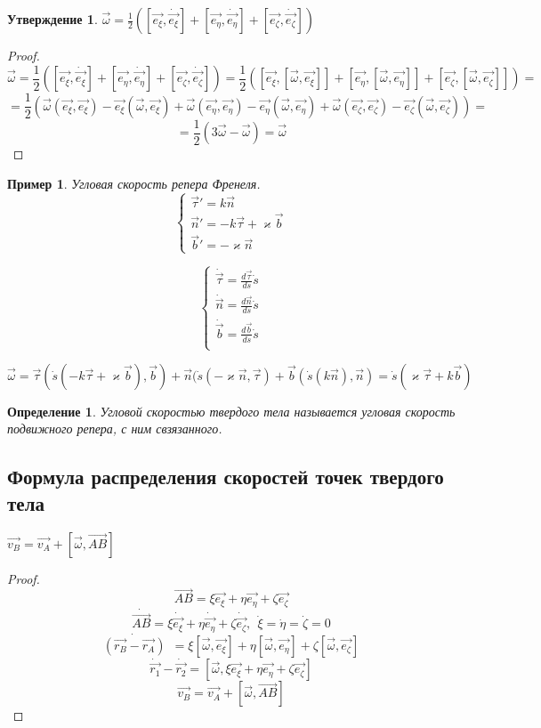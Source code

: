 \documentclass{article}
\renewcommand{\v}[1]{{\vec{#1}}}
\newtheorem*{df}{Определение}
\newtheorem{ass}{Утверждение}
\newtheorem*{xmp}{Пример}
\begin{document}
  \begin{ass}
  $ \v{\omega} = \frac{1}{2} ([\v{e_{\xi}}, \dot{\v{e_{\xi}}}] + [\v{e_{\eta}}, \dot{\v{e_{\eta}}}] + [\v{e_{\zeta}}, \dot{\v{e_{\zeta}}}]) $
  \end{ass}
  \begin{proof}
  $$ \v{\omega} 
  = \frac{1}{2} ([\v{e_{\xi}}, \dot{\v{e_{\xi}}}] + [\v{e_{\eta}}, \dot{\v{e_{\eta}}}] + [\v{e_{\zeta}}, \dot{\v{e_{\zeta}}}]) 
  = \frac{1}{2} ([\v{e_{\xi}}, [\v{\omega}, \v{e_{\xi}}]] + [\v{e_{\eta}}, [\v{\omega}, \v{e_{\eta}}]] + [\v{e_{\zeta}}, [\v{\omega}, \v{e_{\zeta}}]]) = $$
  $$ = \frac{1}{2} \left( \v{\omega}(\v{e_{\xi}}, \v{e_{\xi}}) - \v{e_{\xi}}(\v{\omega}, \v{e_{\xi}}) + \v{\omega}(\v{e_{\eta}}, \v{e_{\eta}}) - \v{e_{\eta}}(\v{\omega}, \v{e_{\eta}}) + \v{\omega}(\v{e_{\zeta}}, \v{e_{\zeta}}) - \v{e_{\zeta}}(\v{\omega}, \v{e_{\zeta}}) \right) = $$ 
  $$ = \frac{1}{2}(3\v{\omega} - \v{\omega}) = \v{\omega} $$
  \end{proof}
  
  \begin{xmp}
  Угловая скорость репера Френеля.
  $$ 
  \begin{cases}
  \v{\tau}' = k \v{n} \\
  \v{n}' = - k\v{\tau} + \varkappa \v{b} \\
  \v{b}' = -\varkappa\v{n}
  \end{cases}
  $$
  
  $$
  \begin{cases}
  \dot{\v{\tau}} = \frac{d\v{\tau}}{ds} \dot s \\
  \dot{\v{n}} = \frac{d\v{n}}{ds} \dot s \\
  \dot{\v{b}} = \frac{d\v{b}}{ds} \dot s \\
  \end{cases} 
  $$
  
  $$ \v{\omega} = \v{\tau}(\dot s (-k\v{\tau} + \varkappa\v{b}), \v{b}) + \v{n}(\dot s (-\varkappa\v{n}, \v{\tau}) + \v{b}(\dot s(k \v{n}), \v{n}) = \dot s (\varkappa\v{\tau} + k\v{b}) $$
  \end{xmp}
  
  \begin{df}
  Угловой скоростью твердого тела называется угловая скорость подвижного репера, с ним свзязанного.
  \end{df}
 
  \subsection{Формула распределения скоростей точек твердого тела}
  $ \v{v_B} = \v{v_A} + [\v{\omega}, \v{AB}] $
  \begin{proof}
  $$ \v{AB} = \xi \v{e_{\xi}} + \eta \v{e_{\eta}} + \zeta \v{e_{\zeta}} $$
  $$ \dot{\v{AB}} = \xi \dot{\v{e_{\xi}}} + \eta \dot{\v{e_{\eta}}} + \zeta \dot{\v{e_{\zeta}}},~~ \dot{\xi} = \dot{\eta} = \dot{\zeta} = 0 $$
  $$ \dot{\left(\v{r_B} - \v{r_A}\right)}~~ = \xi[\v{\omega}, \v{e_{\xi}}] + \eta[\v{\omega}, \v{e_{\eta}}] + \zeta[\v{\omega}, \v{e_{\zeta}}] $$ 
  $$ \dot{\v{r_1}} - \dot{\v{r_2}} = [\v{\omega}, \xi \v{e_{\xi}} + \eta \v{e_{\eta}} + \zeta \v{e_{\zeta}}] $$
  $$ \v{v_B} = \v{v_A} + [\v{\omega}, \v{AB}] $$  
  \end{proof}
  
\end{document}
